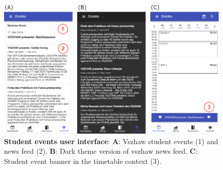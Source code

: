 \begin{markdown}
\begin{figure}[H]
  \includegraphics[width=16cm, center]{./figures/events_figure.png}
  \captionsetup{width=15.5cm}
  \caption[Student events user interface]{\textbf{Student events user interface}: \textbf{A}: Vszhaw student events (1) and news feed (2). \textbf{B}: Dark theme version of vszhaw news feed. \textbf{C}: Student event banner in the timetable context (3).}
  \label{fig:EventsFigure}
\end{figure}

\newpage

\end{markdown}

